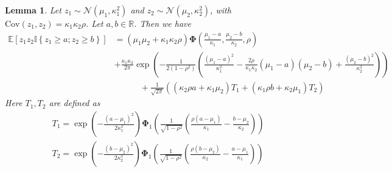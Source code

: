 \documentclass[10pt]{article} %
\newtheorem{lemma}[theorem]{Lemma}
\theoremstyle{definition}
\theoremstyle{plain}
\newcommand{\paren}[1]{\left(#1\right)}
\newcommand{\indy}[1]{\mathbb{I}\left\{#1\right\}}
\providecommand{\E}{\mathbb{E}}
\providecommand{\R}{\mathbb{R}}
\begin{document}
\begin{lemma}
    \label{lem:exp_prod_relu}
    Let $z_1\sim\mathcal{N}\paren{\mu_1,\kappa_1^2}$ and $z_2\sim\mathcal{N}\paren{\mu_2,\kappa_2^2}$, with $\text{Cov}\paren{z_1,z_2} = \kappa_1\kappa_2\rho$. Let $a,b\in\R$. Then we have
    \begin{align*}
        \E\left[z_1z_2\indy{z_1\geq a;z_2\geq b}\right] & = \paren{\mu_1\mu_2+\kappa_1\kappa_2\rho}\bm{\Phi}\paren{\frac{\mu_1-a}{\kappa_1},\frac{\mu_2-b}{\kappa_2},\rho}\\
        & + \frac{\kappa_1\kappa_2}{2\pi}\exp\paren{-\frac{1}{2\paren{1-\rho^2}}\paren{\frac{\paren{\mu_1-a}^2}{\kappa_1^2} - \frac{2\rho}{\kappa_1\kappa_2}\paren{\mu_1-a}\paren{\mu_2-b} + \frac{\paren{\mu_2-b}^2}{\kappa_2^2}}}\\
        &\quad\quad\quad + \frac{1}{\sqrt{2\pi}}\paren{\paren{\kappa_2\rho a + \kappa_1\mu_2}T_1 + \paren{\kappa_1\rho b + \kappa_2\mu_1}T_2}
    \end{align*}
    Here $T_1, T_2$ are defined as
    \begin{align*}
        T_1 = \exp\paren{-\frac{\paren{a- \mu_1}^2}{2\kappa_1^2}}\bm{\Phi}_1\paren{\frac{1}{\sqrt{1-\rho^2}}\paren{\frac{\rho\paren{a-\mu_1}}{\kappa_1} - \frac{b-\mu_2}{\kappa_2}}}\\ T_2 = \exp\paren{-\frac{\paren{b- \mu_2}^2}{2\kappa_2^2}}\bm{\Phi}_1\paren{\frac{1}{\sqrt{1-\rho^2}}\paren{\frac{\rho\paren{b-\mu_2}}{\kappa_2} - \frac{a-\mu_1}{\kappa_1}}}
    \end{align*}
\end{lemma}
\end{document}
